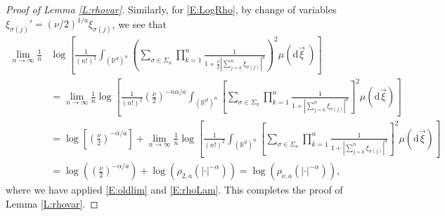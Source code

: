 \documentclass[a4paper,11pt]{article}
\numberwithin{equation}{section}
\numberwithin{equation}{section}
\theoremstyle{plain}
\theoremstyle{definition}
\newcommand{\ud}{\ensuremath{\mathrm{d} }}
\newcommand{\R}{\mathbb{R}}
\begin{document}
\begin{proof}[Proof of Lemma \ref{L:rhovar}]
  Similarly, for \eqref{E:LogRho}, by change of variables $\xi_{\sigma(j)}' =
  \left(\nu/2\right)^{1/a} \xi_{\sigma(j)}$, we see that
  \begin{align*}
      \lim_{n \to \infty} \frac{1}{n}
    & \log \left[ \frac{1}{(n!)^2} \int_{(\R^d)^n} \left( \sum_{\sigma \in \Sigma_n} \prod_{k=1}^n \frac{1}{1+ \frac{\nu}{2}|\sum_{j=k}^n \xi_{\sigma(j)}|^a}\right)^2 \mu (\ud \vec{\xi}\:)\right]                                                                                               \\
    & = \lim_{n \to \infty} \frac{1}{n} \log \left[ \frac{1}{(n!)^2}  \left( \frac{\nu}{2} \right)^{-n\alpha/a}  \int_{(\R^d)^n} \left[\sum_{\sigma \in \Sigma_n} \prod_{k=1}^n \frac{1}{1+\left|\sum_{j=k}^n \xi_{\sigma(j)} \right|^a}\right]^2 \mu(\ud \vec{\xi} )\right]                    \\
    & = \log\left[ \left( \frac{\nu}{2} \right)^{-\alpha/a} \right] +  \lim_{n \to \infty} \frac{1}{n} \log \left[ \frac{1}{(n!)^2} \int_{(\R^d)^n} \left[\sum_{\sigma \in \Sigma_n} \prod_{k=1}^n \frac{1}{1+\left|\sum_{j=k}^n \xi_{\sigma(j)} \right|^a}\right]^2 \mu(\ud \vec{\xi} )\right] \\
    & = \log\left( \left( \frac{\nu}{2} \right)^{-\alpha/a} \right) + \log\left( \rho_{2,a} \left(|\cdot|^{-\alpha}\right) \right)
    = \log\left( \rho_{\nu, a} \left(|\cdot|^{-\alpha}\right)\right),
  \end{align*}
  where we have applied \eqref{E:oldlim} and \eqref{E:rhoLam}. This completes the proof of Lemma
  \ref{L:rhovar}.
\end{proof}
\end{document}
